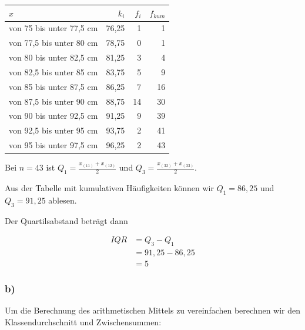 \documentclass[
  11pt,
  ngerman,
  a4paper,
]{report}
\begin{document}
\begin{table}[H]
\centering
\begin{tabular}{lrrr}
\toprule
\textbf{$x$} & \textbf{$k_i$} & \textbf{$f_i$} & \textbf{$f_{kum}$}\\
\midrule
von 75 bis unter 77,5 cm & 76,25 & 1 & 1\\
von 77,5 bis unter 80 cm & 78,75 & 0 & 1\\
von 80 bis unter 82,5 cm & 81,25 & 3 & 4\\
von 82,5 bis unter 85 cm & 83,75 & 5 & 9\\
von 85 bis unter 87,5 cm & 86,25 & 7 & 16\\
von 87,5 bis unter 90 cm & 88,75 & 14 & 30\\
von 90 bis unter 92,5 cm & 91,25 & 9 & 39\\
von 92,5 bis unter 95 cm & 93,75 & 2 & 41\\
von 95 bis unter 97,5 cm & 96,25 & 2 & 43\\
\bottomrule
\end{tabular}
\end{table}

Bei \(n=43\) ist \(Q_1=\frac{x_{(11)}+x_{(12)}}{2}\) und \(Q_3=\frac{x_{(32)}+x_{(33)}}{2}\).

Aus der Tabelle mit kumulativen Häufigkeiten können wir \(Q_1=86{,}25\) und \(Q_3=91{,}25\) ablesen.

Der Quartilsabstand beträgt dann

\[\begin{aligned}
\mathit{IQR}&=Q_3-Q_1\\
            &=91{,}25-86{,}25\\
            &=5
\end{aligned}\]

\hypertarget{b-5}{%
\subsubsection{b)}\label{b-5}}

Um die Berechnung des arithmetischen Mittels zu vereinfachen berechnen wir den Klassendurchschnitt und Zwischensummen:
\end{document}
